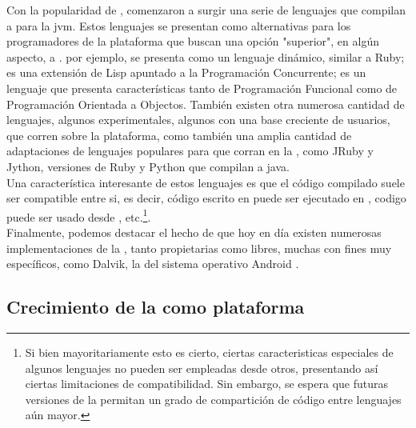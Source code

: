 Con la popularidad de \java, comenzaron a surgir una serie de lenguajes que compilan a
\bytecode para la \acl{jvm}. Estos lenguajes se presentan como alternativas para los
programadores de la plataforma que buscan una opción "superior", en algún aspecto,
a \java. \groovy por ejemplo, se presenta como un lenguaje dinámico, similar a Ruby;
\clojure es una extensión de Lisp apuntado a la Programación Concurrente; \scala es un
lenguaje que presenta características tanto de Programación Funcional como de
Programación Orientada a Objectos. También existen otra numerosa cantidad de lenguajes,
algunos experimentales, algunos con una base creciente de usuarios, que corren sobre la
plataforma, como también una amplia cantidad de adaptaciones de lenguajes populares para
que corran en la \jvm, como JRuby y Jython, versiones de Ruby y Python que compilan a
\bytecode java.\\
Una característica interesante de estos lenguajes es que el código compilado suele ser
compatible entre si, es decir, código escrito en \java puede ser ejecutado en \scala,
codigo \groovy puede ser usado desde \clojure, etc.\footnote{
	Si bien mayoritariamente esto es cierto, ciertas caracteristicas especiales de algunos
	lenguajes no pueden ser empleadas desde otros, presentando así ciertas limitaciones de
	compatibilidad. Sin embargo, se espera que futuras versiones de la \jvm permitan un
	grado de compartición de código entre lenguajes aún mayor.
}.\\
Finalmente, podemos destacar el hecho de que hoy en día existen numerosas implementaciones
de la \jvm, tanto propietarias como libres, muchas con fines muy específicos, como Dalvik,
la \jvm del sistema operativo Android .\\


\subsection{Crecimiento de la \jvm como plataforma}
\label{subsec:intro:jvm_growth}

